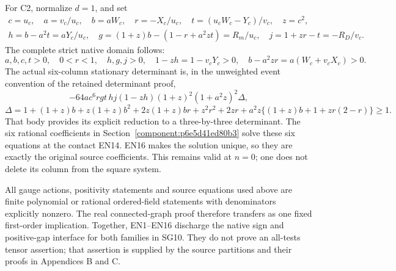 For C2, normalize \(d=1\), and set
\[
\begin{gathered}
 c=u_c,\quad a=v_c/u_c,\quad b=aW_c,\quad r=-X_c/u_c,\quad
 t=(u_cW_c-Y_c)/v_c,\quad z=c^2,\\
 h=b-a^2t=aY_c/u_c,\quad
 g=(1+z)b-(1-r+a^2zt)=R_m/u_c,\quad
 j=1+zr-t=-R_D/v_c .
\end{gathered}\tag{EN14}
\]
The complete strict native domain follows:
\[
 a,b,c,t>0,\quad 0<r<1,\quad h,g,j>0,\quad
 1-zh=1-v_cY_c>0,\quad b-a^2zr=a(W_c+v_cX_c)>0.
 \tag{EN15}
\]
The actual six-column stationary determinant is, in the unweighted
event convention of the retained determinant proof,
\[
 -64ac^6rgt\,hj(1-zh)(1+z)^2(1+a^2z)^2\Delta,
\]
\[
 \Delta=1+(1+z)b+z(1+z)b^2+2z(1+z)br+z^2r^2+2zr
        +a^2z\{(1+z)b+1+zr(2-r)\}\ge1 .
 \tag{EN16}
\]
That body provides its explicit reduction to a three-by-three
determinant.  The six rational coefficients in
Section~\ref{component:p6e5d41ed80b3} solve these six equations at the
contact EN14.  EN16 makes the solution unique, so they are exactly
the original source coefficients.  This remains valid at \(n=0\);
one does not delete its column from the square system.

All gauge actions, positivity statements and source equations used
above are finite polynomial or rational ordered-field statements
with denominators explicitly nonzero.  The real connected-graph
proof therefore transfers as one fixed first-order implication.
Together, EN1--EN16 discharge the native sign and positive-gap
interface for both families in SG10.  They do not prove an
all-tests tensor assertion; that assertion is supplied by the
source partitions and their proofs in Appendices B and C.

